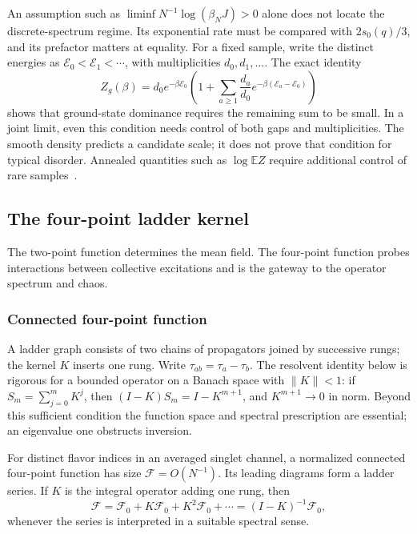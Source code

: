 \documentclass[11pt]{article}
\numberwithin{equation}{section}
\theoremstyle{exposition}
\theoremstyle{result}
\newcommand{\E}{\mathbb E}
\newcommand{\cF}{\mathcal F}
\begin{document}
An assumption such as $\liminf N^{-1}\log(\beta_NJ)>0$ alone does not locate the discrete-spectrum regime. Its exponential rate must be compared with $2s_0(q)/3$, and its prefactor matters at equality. For a fixed sample, write the distinct energies as $\mathcal E_0<\mathcal E_1<\cdots$, with multiplicities $d_0,d_1,\ldots$. The exact identity
\begin{equation*}
Z_g(\beta)=d_0e^{-\beta\mathcal E_0}
\left(1+\sum_{a\geq1}\frac{d_a}{d_0}
e^{-\beta(\mathcal E_a-\mathcal E_0)}\right)
\end{equation*}
shows that ground-state dominance requires the remaining sum to be small. In a joint limit, even this condition needs control of both gaps and multiplicities. The smooth density predicts a candidate scale; it does not prove that condition for typical disorder. Annealed quantities such as $\log\E Z$ require additional control of rare samples~\cite{Cotler,SSS}.

\subsection{The four-point ladder kernel}

The two-point function determines the mean field. The four-point function probes interactions between collective excitations and is the gateway to the operator spectrum and chaos.

\subsubsection{Connected four-point function}


A ladder graph consists of two chains of propagators joined by successive rungs; the kernel $K$ inserts one rung. Write $\tau_{ab}=\tau_a-\tau_b$. The resolvent identity below is rigorous for a bounded operator on a Banach space with $\|K\|<1$: if $S_m=\sum_{j=0}^mK^j$, then $(I-K)S_m=I-K^{m+1}$, and $K^{m+1}\to0$ in norm. Beyond this sufficient condition the function space and spectral prescription are essential; an eigenvalue one obstructs inversion.

For distinct flavor indices in an averaged singlet channel, a normalized connected four-point function has size $\cF=O(N^{-1})$. Its leading diagrams form a ladder series. If $K$ is the integral operator adding one rung, then
\begin{equation}
\cF=\cF_0+K\cF_0+K^2\cF_0+\cdots
=(I-K)^{-1}\cF_0,
\label{eq:laddergeom}
\end{equation}
whenever the series is interpreted in a suitable spectral sense.
\end{document}
